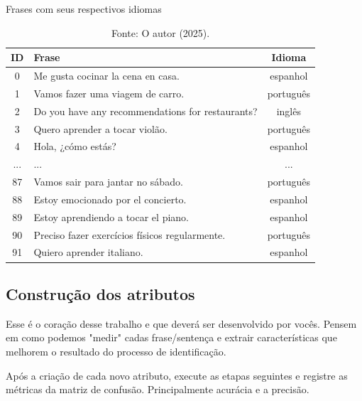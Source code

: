 \begin{table}[H]
\centering
\caption{Frases com seus respectivos idiomas}
\begin{tabular}{|c|p{9cm}|c|}
\hline
\textbf{ID} & \textbf{Frase} & \textbf{Idioma} \\
\hline
0 & Me gusta cocinar la cena en casa. & espanhol \\
1 & Vamos fazer uma viagem de carro. & português \\
2 & Do you have any recommendations for restaurants? & inglês \\
3 & Quero aprender a tocar violão. & português \\
4 & Hola, ¿cómo estás? & espanhol \\
\hline
... & ... & ... \\
\hline
87 & Vamos sair para jantar no sábado. & português \\
88 & Estoy emocionado por el concierto. & espanhol \\
89 & Estoy aprendiendo a tocar el piano. & espanhol \\
90 & Preciso fazer exercícios físicos regularmente. & português \\
91 & Quiero aprender italiano. & espanhol \\
\hline
\end{tabular}
\vspace{0.5em}
\caption*{Fonte: O autor (2025).}
\label{tab:frases_idiomas}
\end{table}


\subsection*{\textbf{Construção dos atributos}}

Esse é o coração desse trabalho e que deverá ser desenvolvido por vocês. Pensem em como podemos "medir" cadas frase/sentença e extrair características que melhorem o resultado do processo de identificação.


Após a criação de cada novo atributo, execute as etapas seguintes e registre as métricas da matriz de confusão. Principalmente acurácia e a precisão.


